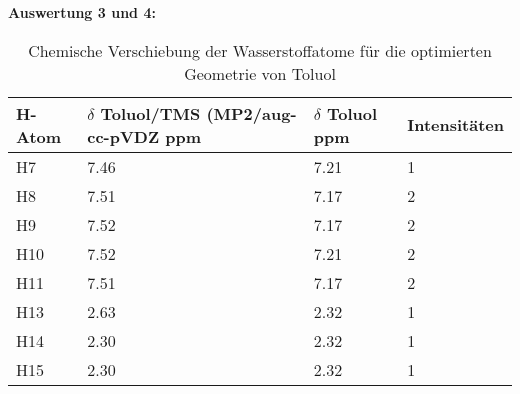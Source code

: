 \documentclass[12pt]{article}
\begin{document}
\begin{onehalfspace}
\textbf{Auswertung 3 und 4:}
\begin{table}[!htpb]
\caption{Chemische Verschiebung der Wasserstoffatome für die optimierten Geometrie von Toluol}
\begin{tabular}{llll}
\toprule
H-Atom  & \parbox[t]{4cm}{$\delta$ Toluol/TMS \\ (MP2/aug-cc-pVDZ\\ ppm}  &  \parbox[t]{4cm}{$\delta$ Toluol\cite{zeeh} ppm} & Intensitäten\\
\midrule
H7  & 7.46 & 7.21 & 1 \\
H8  & 7.51 & 7.17 & 2  \\
H9  &  7.52 & 7.17 & 2  \\
H10 & 7.52 & 7.21 & 2 \\
H11 & 7.51 & 7.17 & 2 \\
H13 & 2.63& 2.32 & 1 \\
H14 & 2.30 & 2.32 & 1 \\
H15 & 2.30 & 2.32 & 1 \\
\bottomrule
\end{tabular}
\end{table}

\end{onehalfspace}
\end{document}
